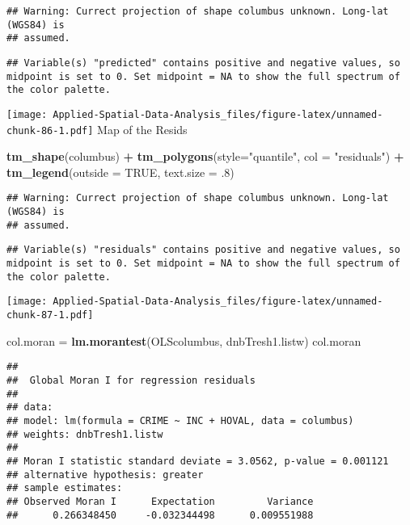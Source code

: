 \documentclass[
]{book}
\newenvironment{Shaded}{\begin{snugshade}}{\end{snugshade}}
\newcommand{\DataTypeTok}[1]{\textcolor[rgb]{0.13,0.29,0.53}{#1}}
\newcommand{\FloatTok}[1]{\textcolor[rgb]{0.00,0.00,0.81}{#1}}
\newcommand{\KeywordTok}[1]{\textcolor[rgb]{0.13,0.29,0.53}{\textbf{#1}}}
\newcommand{\NormalTok}[1]{#1}
\newcommand{\OperatorTok}[1]{\textcolor[rgb]{0.81,0.36,0.00}{\textbf{#1}}}
\newcommand{\OtherTok}[1]{\textcolor[rgb]{0.56,0.35,0.01}{#1}}
\newcommand{\StringTok}[1]{\textcolor[rgb]{0.31,0.60,0.02}{#1}}
\begin{document}
\begin{verbatim}
## Warning: Currect projection of shape columbus unknown. Long-lat (WGS84) is
## assumed.
\end{verbatim}

\begin{verbatim}
## Variable(s) "predicted" contains positive and negative values, so midpoint is set to 0. Set midpoint = NA to show the full spectrum of the color palette.
\end{verbatim}

\texttt{[image: Applied-Spatial-Data-Analysis\_files/figure-latex/unnamed-chunk-86-1.pdf]}
Map of the Resids

\begin{Shaded}
\begin{Highlighting}[]
\KeywordTok{tm_shape}\NormalTok{(columbus) }\OperatorTok{+}\StringTok{ }\KeywordTok{tm_polygons}\NormalTok{(}\DataTypeTok{style=}\StringTok{"quantile"}\NormalTok{, }\DataTypeTok{col =} \StringTok{"residuals"}\NormalTok{) }\OperatorTok{+}
\StringTok{     }\KeywordTok{tm_legend}\NormalTok{(}\DataTypeTok{outside =} \OtherTok{TRUE}\NormalTok{, }\DataTypeTok{text.size =} \FloatTok{.8}\NormalTok{)}
\end{Highlighting}
\end{Shaded}

\begin{verbatim}
## Warning: Currect projection of shape columbus unknown. Long-lat (WGS84) is
## assumed.
\end{verbatim}

\begin{verbatim}
## Variable(s) "residuals" contains positive and negative values, so midpoint is set to 0. Set midpoint = NA to show the full spectrum of the color palette.
\end{verbatim}

\texttt{[image: Applied-Spatial-Data-Analysis\_files/figure-latex/unnamed-chunk-87-1.pdf]}

\begin{Shaded}
\begin{Highlighting}[]
\NormalTok{col.moran =}\StringTok{ }\KeywordTok{lm.morantest}\NormalTok{(OLScolumbus, dnbTresh1.listw)}
\NormalTok{col.moran}
\end{Highlighting}
\end{Shaded}

\begin{verbatim}
## 
## 	Global Moran I for regression residuals
## 
## data:  
## model: lm(formula = CRIME ~ INC + HOVAL, data = columbus)
## weights: dnbTresh1.listw
## 
## Moran I statistic standard deviate = 3.0562, p-value = 0.001121
## alternative hypothesis: greater
## sample estimates:
## Observed Moran I      Expectation         Variance 
##      0.266348450     -0.032344498      0.009551988
\end{verbatim}
\end{document}
